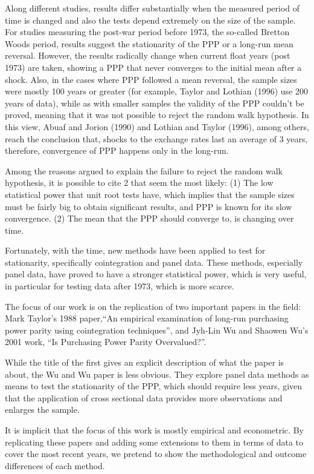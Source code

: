 \documentclass[]{article}
\begin{document}
Along different studies, results differ substantially when the measured period of time is changed and also the tests depend extremely on the size of the sample. For studies measuring the post-war period before 1973, the so-called Bretton Woods period, results suggest the stationarity of the PPP or a long-run mean reversal. However, the results radically change when current float years (post 1973) are taken, showing a PPP that never
converges to the initial mean after a shock. Also, in the cases where PPP followed a mean reversal, the sample sizes were mostly 100 years or greater (for example, Taylor and Lothian (1996) use 200 years of data), while as with smaller samples the validity of the PPP couldn't be proved, meaning that it was not possible to reject the random walk hypothesis. In this view, Abuaf and Jorion (1990) and Lothian and Taylor (1996), among others, reach the conclusion that, shocks to the exchange rates last an average of 3 years, therefore, convergence of PPP happens only in the long-run.

Among the reasons argued to explain the failure to reject the random walk hypothesis, it is possible to cite 2 that seem the most likely: (1) The low statistical power that unit root tests have, which implies that the sample sizes must be fairly big to obtain significant
results, and PPP is known for its slow convergence. (2) The mean that the PPP should converge to, is changing over time.

Fortunately, with the time, new methods have been applied to test for stationarity, specifically cointegration and panel data. These methods, especially panel data, have proved to have a stronger statistical power, which is very useful, in particular for testing
data after 1973, which is more scarce.

The focus of our work is on the replication of two important papers in the field: Mark Taylor's 1988 paper,``An empirical examination of long-run purchasing power parity using cointegration techniques'', and Jyh-Lin Wu and Shaowen Wu's 2001 work, ``Is Purchasing
Power Parity Overvalued?''.

While the title of the first gives an explicit description of what the paper is about, the Wu and Wu paper is less obvious. They explore panel data methods as means to test the stationarity of the PPP, which should require less years, given that the application of cross
sectional data provides more observations and enlarges the sample.

It is implicit that the focus of this work is mostly empirical and econometric. By replicating these papers and adding some extensions to them in terms of data to cover the most recent years, we pretend to show the methodological and outcome differences of each
method.
\end{document}
